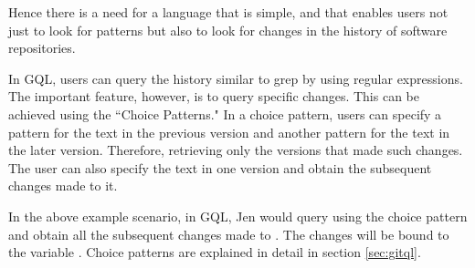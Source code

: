 Hence there is a need for a language that is simple, and that enables users not just to look for patterns but also to look for changes in the history of software repositories.


In GQL, users can query the history similar to grep by using regular expressions.
The important feature, however, is to query specific changes. This can be achieved using the ``Choice Patterns."  In a choice pattern, users can specify a pattern for the text in the previous version and another pattern for the text in the later version. Therefore, retrieving only the versions that made such changes. The user can also specify the text in one version and obtain the subsequent changes made to it.

In the above example scenario, in GQL, Jen would query using the choice pattern  and obtain all the subsequent changes made to . The changes will be bound to the variable . Choice patterns are explained in detail in section \ref{sec:gitql}.



